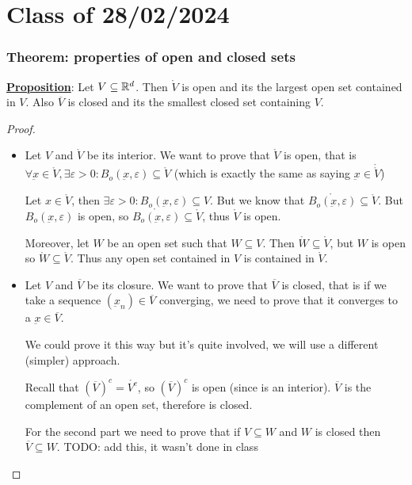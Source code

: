 \documentclass[10pt]{extarticle}
\renewcommand{\vec}[1]{\underbar{\ensuremath{#1}}}
\begin{document}
\section{Class of 28/02/2024}

\subsubsection{Theorem: properties of open and closed sets}

\textbf{\underline{Proposition}}: Let $V \subseteq \mathbb{R}^d$.
Then $\mathring{V}$ is open and its the largest open set contained in $V$.
Also $\overline{V}$ is closed and its the smallest closed set containing $V$.

\begin{proof}
    \skiplineafterproof
    \begin{itemize}
        \item
              Let $V$ and $\mathring V$ be its interior. We want to prove that $\mathring V$ is open, that is $\forall \vec{x} \in \mathring V, \exists \varepsilon > 0 : B_o(\vec{x}, \varepsilon) \subseteq \mathring V$ (which is exactly the same as saying $\vec{x} \in \mathring{\mathring{V}}$)

              Let $x \in \mathring V$, then $\exists \varepsilon > 0 : B_o(\vec{x}, \varepsilon) \subseteq V$.
              But we know that $\mathring{B_o(\vec{x}, \varepsilon)} \subseteq \mathring{V}$.
              But $B_o(\vec{x}, \varepsilon)$ is open, so $\mathring{B_o(\vec{x}, \varepsilon)} \subseteq \mathring{V}$, thus $\mathring{V}$ is open.

              Moreover, let $W$ be an open set such that $W \subseteq V$.
              Then $\mathring{W} \subseteq \mathring{V}$, but $W$ is open so $\mathring{W} \subseteq \mathring{V}$. Thus any open set contained in $V$ is contained in $\mathring{V}$.

        \item
              Let $V$ and $\overline V$ be its closure. We want to prove that $\overline V$ is closed, that is if we take a sequence $\left(\vec{x}_n\right) \in \overline{V}$ converging, we need to prove that it converges to a $\vec{x} \in \overline V$.

              We could prove it this way but it's quite involved, we will use a different (simpler) approach.

              Recall that $\left(\overline{V}\right)^c = \mathring{V^c}$, so $\left(\overline{V}\right)^c$ is open (since is an interior).
              $\overline{V}$ is the complement of an open set, therefore is closed.

              For the second part we need to prove that if $V \subseteq W$ and $W$ is closed then $\overline{V} \subseteq W$.
              TODO: add this, it wasn't done in class
    \end{itemize}
\end{proof}
\end{document}
